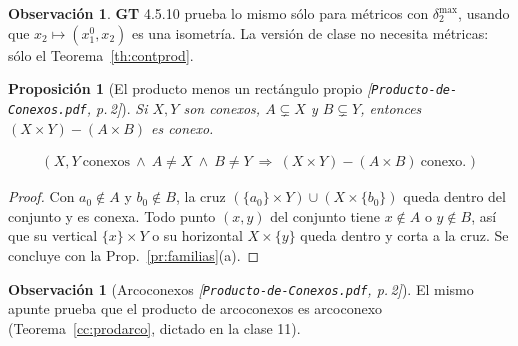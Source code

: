 \documentclass[11pt,a4paper]{article}
\newcommand{\lgc}[1]{\par\vspace{-3pt}\begin{gather*}\big(\;#1\;\big)\end{gather*}\vspace{-6pt}}
\newcommand{\figtit}[1]{\par\vspace{2pt}{\footnotesize\itshape #1}\par}
\theoremstyle{definition}
\newtheorem{observacion}[definicion]{Observación}
\theoremstyle{plain}
\newtheorem{proposicion}[definicion]{Proposición}
\newcommand{\fnt}[1]{{\normalfont\small\itshape\color{gray!150!black}[#1]}}
\begin{document}
\begin{figure}[ht]
\centering
{}
\figtit{Figura 17. La cruz del pizarrón: una copia de $X$ (horizontal) y una de $Y$ (vertical), conexas por ser imágenes continuas, que se cruzan en $(x_2,y_1)$. Hay que tomar una coordenada de cada punto para que las dos rayas se crucen.}
\end{figure}

\begin{observacion}
\textbf{GT} 4.5.10 prueba lo mismo sólo para métricos con $\delta^{\max}_2$, usando que $x_2\mapsto(x^0_1,x_2)$ es una isometría. La versión de clase no necesita métricas: sólo el Teorema~\ref{th:contprod}.
\end{observacion}

\begin{proposicion}[El producto menos un rectángulo propio \fnt{\texttt{Producto-de-Conexos.pdf}, p.\,2}]
Si $X,Y$ son conexos, $A\subsetneq X$ y $B\subsetneq Y$, entonces $(X\times Y)-(A\times B)$ es conexo.
\lgc{X,Y\ \text{conexos}\ \wedge\ A\ne X\ \wedge\ B\ne Y\ \Rightarrow\ (X\times Y)-(A\times B)\ \text{conexo}.}
\end{proposicion}

\begin{proof}
Con $a_0\notin A$ y $b_0\notin B$, la cruz $(\{a_0\}\times Y)\cup(X\times\{b_0\})$ queda dentro del conjunto y es conexa. Todo punto $(x,y)$ del conjunto tiene $x\notin A$ o $y\notin B$, así que su vertical $\{x\}\times Y$ o su horizontal $X\times\{y\}$ queda dentro y corta a la cruz. Se concluye con la Prop.~\ref{pr:familias}(a).
\end{proof}

\begin{observacion}[Arcoconexos \fnt{\texttt{Producto-de-Conexos.pdf}, p.\,2}]
El mismo apunte prueba que el producto de arcoconexos es arcoconexo (Teorema~\ref{cc:prodarco}, dictado en la clase 11).
\end{observacion}
\end{document}
